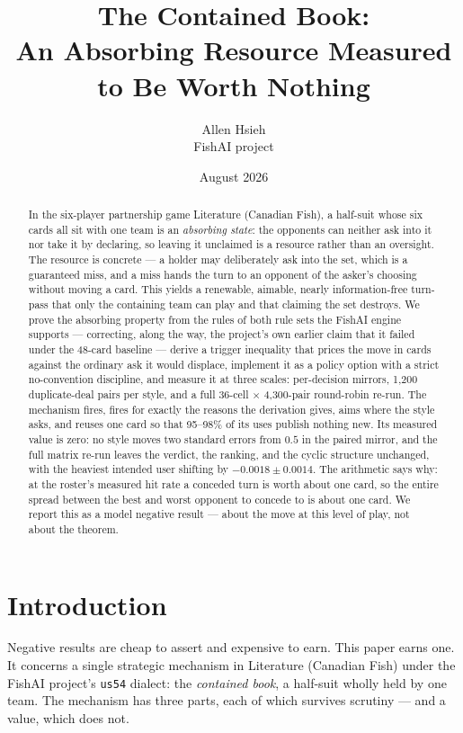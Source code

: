 \documentclass[11pt]{article}
\title{The Contained Book:\\An Absorbing Resource Measured to Be Worth Nothing}
\author{Allen Hsieh\\[2pt]{\small FishAI project}}
\date{August 2026}
\newcommand{\code}[1]{\texttt{#1}}
\begin{document}
\maketitle

\begin{abstract}
\noindent
In the six-player partnership game Literature (Canadian Fish), a half-suit whose
six cards all sit with one team is an \emph{absorbing state}: the opponents can
neither ask into it nor take it by declaring, so leaving it unclaimed is a
resource rather than an oversight. The resource is concrete --- a holder may
deliberately ask into the set, which is a guaranteed miss, and a miss hands the
turn to an opponent of the asker's choosing without moving a card. This yields a
renewable, aimable, nearly information-free turn-pass that only the containing
team can play and that claiming the set destroys. We prove the absorbing
property from the rules of both rule sets the FishAI engine supports ---
correcting, along the way, the project's own earlier claim that it failed under
the 48-card baseline --- derive a trigger inequality that prices the move in
cards against the ordinary ask it would displace, implement it as a policy
option with a strict no-convention discipline, and measure it at three scales:
per-decision mirrors, 1{,}200 duplicate-deal pairs per style, and a full
$36$-cell $\times$ 4{,}300-pair round-robin re-run. The mechanism fires, fires
for exactly the reasons the derivation gives, aims where the style asks, and
reuses one card so that 95--98\% of its uses publish nothing new. Its measured
value is zero: no style moves two standard errors from $0.5$ in the paired
mirror, and the full matrix re-run leaves the verdict, the ranking, and the
cyclic structure unchanged, with the heaviest intended user shifting by
$-0.0018 \pm 0.0014$. The arithmetic says why: at the roster's measured hit
rate a conceded turn is worth about one card, so the entire spread between the
best and worst opponent to concede to is about one card. We report this as a
model negative result --- about the move at this level of play, not about the
theorem.
\end{abstract}

\section{Introduction}
\label{sec:intro}

Negative results are cheap to assert and expensive to earn. This paper earns
one. It concerns a single strategic mechanism in Literature (Canadian Fish)
under the FishAI project's \code{us54} dialect: the \emph{contained book}, a
half-suit wholly held by one team. The mechanism has three parts, each of which
survives scrutiny --- and a value, which does not.
\end{document}
